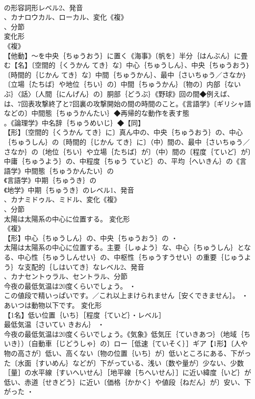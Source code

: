 \documentclass[8pt]{extreport}
\begin{document}
\begin{CJK}{UTF8}{min}
\\	の形容詞形レベル2、発音
\\	、カナロウカル、ローカル、変化《複》
\\	、分節
\\	変化形 
\\	《複》
\\	【他動】～を中央｛ちゅうおう｝に置く《海事》〔帆を〕半分｛はんぶん｝に畳む【名】〔空間的｛くうかん てき｝な〕中心｛ちゅうしん｝、中央｛ちゅうおう｝〔時間的｛じかん てき｝な〕中間｛ちゅうかん｝、最中｛さいちゅう／さなか｝〔立場｛たちば｝や地位｛ちい｝の〕中間｛ちゅうかん｝〔物の〕内部｛ないぶ｝〈話〉〔人間｛にんげん｝の〕胴部｛どうぶ｝《野球》回の間◆例えば、
\\	は、7回表攻撃終了と7回裏の攻撃開始の間の時間のこと。《言語学》〔ギリシャ語などの〕中間態｛ちゅうかんたい｝◆再帰的な動作を表す態
\\	。《論理学》中名辞｛ちゅうめいじ｝◆【同】
\\	【形】〔空間的｛くうかん てき｝に〕真ん中の、中央｛ちゅうおう｝の、中心｛ちゅうしん｝の〔時間的｛じかん てき｝に〕（中）間の、最中｛さいちゅう／さなか｝の〔地位｛ちい｝や立場｛たちば｝が〕（中）間の〔程度｛ていど｝が〕中庸｛ちゅうよう｝の、中程度｛ちゅう ていど｝の、平均｛へいきん｝の《言語学》中間態｛ちゅうかんたい｝の
\\	《言語学》中期｛ちゅうき｝の
\\	《地学》中期｛ちゅうき｝のレベル1、発音
\\	、カナミドゥル、ミドル、変化《複》
\\	、分節
\\	太陽は太陽系の中心に位置する。	変化形 
\\	《複》
\\	【形】中心｛ちゅうしん｝の、中央｛ちゅうおう｝の ・
\\	太陽は太陽系の中心に位置する。主要｛しゅよう｝な、中心｛ちゅうしん｝となる、中心性｛ちゅうしんせい｝の、中枢性｛ちゅうすうせい｝の重要｛じゅうよう｝な支配的｛しはいてき｝なレベル2、発音
\\	、カナセントゥラル、セントラル、分節
\\	今夜の最低気温は20度くらいでしょう。 ・
\\	この値段で精いっぱいです。／これ以上まけられません［安くできません］。 ・
\\	あいつは動物以下です。	変化形 
\\	【1名】低い位置｛いち｝［程度｛ていど｝・レベル］
\\	最低気温｛さいてい きおん｝ ・
\\	今夜の最低気温は20度くらいでしょう。《気象》低気圧｛ていきあつ｝（地域｛ちいき｝）〔自動車｛じどうしゃ｝の〕ロー［低速｛ていそく｝］ギア【1形】〔人や物の高さが〕低い、高くない〔物の位置｛いち｝が〕低いところにある、下がった〔水面｛すいめん｝などが〕下がっている、浅い〔数や量が〕少ない、少数［量］の水平線｛すいへいせん｝［地平線｛ちへいせん｝］に近い緯度｛いど｝が低い、赤道｛せきどう｝に近い〔価格｛かかく｝や値段｛ねだん｝が〕安い、下がった ・

\end{CJK}
\end{document}

